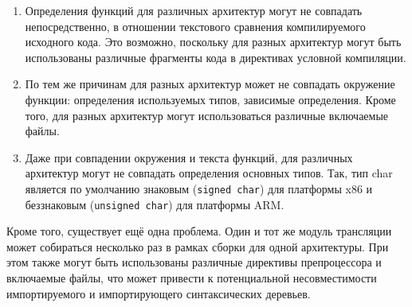 \begin{enumerate}
 \item Определения функций для различных архитектур могут не совпадать непосредственно, в отношении текстового сравнения компилируемого исходного кода. Это возможно, поскольку для разных архитектур могут быть использованы различные фрагменты кода в директивах условной компиляции.
 \item По тем же причинам для разных архитектур может не совпадать окружение функции: определения используемых типов, зависимые определения. Кроме того, для разных архитектур могут использоваться различные включаемые файлы.
 \item Даже при совпадении окружения и текста функций, для различных архитектур могут не совпадать определения основных типов. Так, тип char является по умолчанию знаковым (\texttt{signed char}) для платформы x86 и беззнаковым (\texttt{unsigned char}) для платформы ARM.
\end{enumerate}

Кроме того, существует ещё одна проблема. Один и тот же модуль трансляции может собираться несколько раз в рамках сборки для одной архитектуры. При этом также могут быть использованы различные директивы препроцессора и включаемые файлы, что может привести к потенциальной несовместимости импортируемого и импортирующего синтаксических деревьев.

